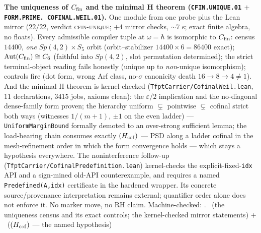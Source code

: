 \documentclass[11pt,a4paper]{article}
\theoremstyle{definition}
\begin{document}
\par\smallskip\noindent\textbf{The uniqueness of $C_{\rm fin}$
and the minimal H theorem (\texttt{CFIN.\allowbreak UNIQUE.01}
$+$ \texttt{FORM.\allowbreak PRIME.\allowbreak
COFINAL.\allowbreak WEIL.01}).}
One module from one probe plus the Lean mirror ($22/22$, verdict
\textsc{cfin-unique}; $+ 4$ mirror checks, ${\sim}7$ s; exact
finite algebra, no floats).  Every admissible compiler tuple at
$\omega = \hbar$ is isomorphic to $C_{\rm fin}$: census $14400$,
\emph{one} $Sp(4,2)\times S_5$ orbit (orbit--stabilizer $14400
\times 6 = 86400$ exact); $\mathrm{Aut}(C_{\rm fin}) \cong C_6$
(faithful into $Sp(4,2)$, slot permutation determined); the
strict terminal-object reading fails honestly (unique up to
\emph{non}-unique isomorphism); controls fire (dot form, wrong
Arf class, no-$\sigma$ canonicity death $16 \to 8 \to 4 \ne 1$).
And the minimal H theorem is kernel-checked
(\texttt{TfptCarrier/CofinalWeil.lean}, $11$ declarations, $3415$
jobs, axioms clean): the $\varepsilon/2$ implication and the
no-diagonal dense-family form proven; the hierarchy uniform
$\subsetneq$ pointwise $\subsetneq$ cofinal strict both ways
(witnesses $1/(m{+}1)$, $\pm1$ on the even ladder) ---
\texttt{UniformMarginBound} formally demoted to an over-strong
sufficient lemma; the load-bearing chain consumes exactly
$(H_{\rm cof})$ --- PSD along a ladder cofinal in the
mesh-refinement order in which the form convergence holds ---
which stays a hypothesis everywhere.  The
noninterference follow-up
(\texttt{TfptCarrier/CofinalPredefinition.lean}) kernel-checks the
explicit-fixed-\texttt{idx} API and a sign-mined old-API
counterexample, and requires a named
\texttt{Predefined(A,idx)} certificate in the hardened wrapper.
Its concrete source/provenance interpretation remains external;
quantifier order alone does not enforce it.  No marker move, no RH
claim.
Machine-checked: .
\mE\ (the uniqueness census and its exact controls; the
kernel-checked mirror statements) $+$ \mO\ ($(H_{\rm cof})$ ---
the named hypothesis)
\par\smallskip
\end{document}
